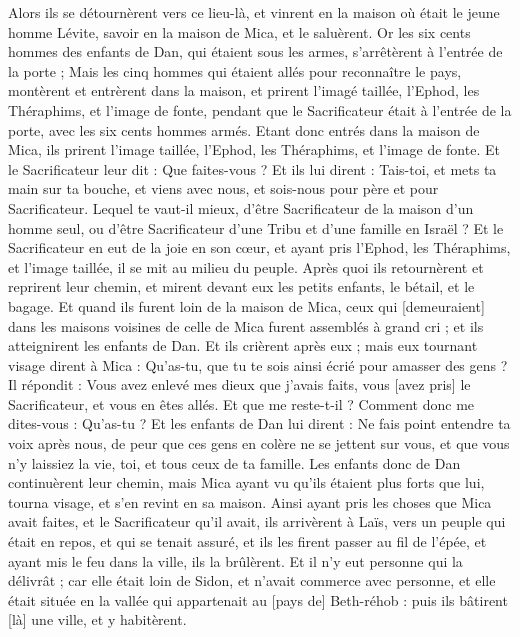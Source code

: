 \begin{multicols}{2}
Alors ils se détournèrent vers ce lieu-là, et vinrent en la maison où était le jeune homme Lévite, savoir en la maison de Mica, et le saluèrent.
Or les six cents hommes des enfants de Dan, qui étaient sous les armes, s'arrêtèrent à l'entrée de la porte ;
Mais les cinq hommes qui étaient allés pour reconnaître le pays, montèrent et entrèrent dans la maison, et prirent l'imagé taillée, l'Ephod, les Théraphims, et l'image de fonte, pendant que le Sacrificateur était à l'entrée de la porte, avec les six cents hommes armés.
Etant donc entrés dans la maison de Mica, ils prirent l'image taillée, l'Ephod, les Théraphims, et l'image de fonte. Et le Sacrificateur leur dit : Que faites-vous ?
Et ils lui dirent : Tais-toi, et mets ta main sur ta bouche, et viens avec nous, et sois-nous pour père et pour Sacrificateur. Lequel te vaut-il mieux, d'être Sacrificateur de la maison d'un homme seul, ou d'être Sacrificateur d'une Tribu et d'une famille en Israël ?
Et le Sacrificateur en eut de la joie en son cœur, et ayant pris l'Ephod, les Théraphims, et l'image taillée, il se mit au milieu du peuple.
Après quoi ils retournèrent et reprirent leur chemin, et mirent devant eux les petits enfants, le bétail, et le bagage.
Et quand ils furent loin de la maison de Mica, ceux qui [demeuraient] dans les maisons voisines de celle de Mica furent assemblés à grand cri ; et ils atteignirent les enfants de Dan.
Et ils crièrent après eux ; mais eux tournant visage dirent à Mica : Qu'as-tu, que tu te sois ainsi écrié pour amasser des gens ?
Il répondit : Vous avez enlevé mes dieux que j'avais faits, vous [avez pris] le Sacrificateur, et vous en êtes allés. Et que me reste-t-il ? Comment donc me dites-vous : Qu'as-tu ?
Et les enfants de Dan lui dirent : Ne fais point entendre ta voix après nous, de peur que ces gens en colère ne se jettent sur vous, et que vous n'y laissiez la vie, toi, et tous ceux de ta famille.
Les enfants donc de Dan continuèrent leur chemin, mais Mica ayant vu qu'ils étaient plus forts que lui, tourna visage, et s'en revint en sa maison.
Ainsi ayant pris les choses que Mica avait faites, et le Sacrificateur qu'il avait, ils arrivèrent à Laïs, vers un peuple qui était en repos, et qui se tenait assuré, et ils les firent passer au fil de l'épée, et ayant mis le feu dans la ville, ils la brûlèrent.
Et il n'y eut personne qui la délivrât ; car elle était loin de Sidon, et n'avait commerce avec personne, et elle était située en la vallée qui appartenait au [pays de] Beth-réhob : puis ils bâtirent [là] une ville, et y habitèrent.

\end{multicols}
